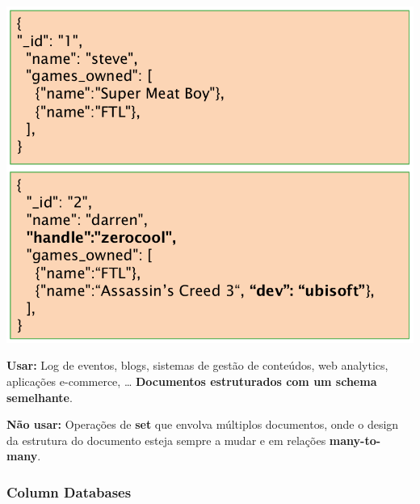\documentclass{article}
\begin{document}
\begin{center}
  \includegraphics[scale=0.2]{9}
\end{center}

\begin{flushleft}
  \textbf{Usar:} Log de eventos, blogs, sistemas de gestão de conteúdos,
  web analytics, aplicações e-commerce, \dots
  \textbf{Documentos estruturados com um schema semelhante}.

  \textbf{Não usar:} Operações de \textbf{set} que envolva múltiplos documentos,
  onde o design da estrutura do documento esteja sempre a mudar e
  em relações \textbf{many-to-many}.
\end{flushleft}

\subsubsection{Column Databases}
\end{document}
